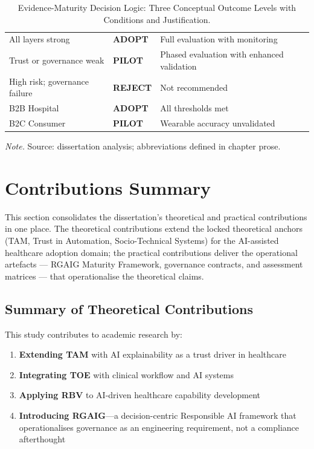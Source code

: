 {\tablestripes\tablefontsize
{}
\begin{xltabular}{\textwidth}{@{} >{\raggedright\arraybackslash}p{3.5cm} >{\centering\arraybackslash}p{2.0cm} L @{}}
\caption[Evidence-Maturity Decision Logic: Three Conceptual Outcome Levels with]{Evidence-Maturity Decision Logic: Three Conceptual Outcome Levels with Conditions and Justification.}\label{tab:ch5_decision_logic} \\
\toprule
{} &  &  \\
\midrule
\endfirsthead
\endhead
\bottomrule
\endlastfoot
All layers strong & \textbf{ADOPT} & Full evaluation with monitoring \\
\addlinespace
Trust or governance weak & \textbf{PILOT} & Phased evaluation with enhanced validation \\
\addlinespace
High risk; governance failure & \textbf{REJECT} & Not recommended \\
\midrule
B2B Hospital & \textbf{ADOPT} & All thresholds met \\
B2C Consumer & \textbf{PILOT} & Wearable accuracy unvalidated \\
\end{xltabular}}
\vspace{0.3em}\noindent\textit{Note.} Source: dissertation analysis; abbreviations defined in chapter prose.

\section{Contributions Summary}
\label{sec:ch5_contributions_summary}

\noindent This section consolidates the dissertation's theoretical and practical contributions in one place. The theoretical contributions extend the locked theoretical anchors (TAM, Trust in Automation, Socio-Technical Systems) for the AI-assisted healthcare adoption domain; the practical contributions deliver the operational artefacts — RGAIG Maturity Framework, governance contracts, and assessment matrices — that operationalise the theoretical claims.

\subsection{Summary of Theoretical Contributions}

This study contributes to academic research by:

\begin{enumerate}[label=(\alph*)]
    \item \textbf{Extending TAM} with AI explainability as a trust driver in healthcare
    \item \textbf{Integrating TOE} with clinical workflow and AI systems
    \item \textbf{Applying RBV} to AI-driven healthcare capability development
    \item \textbf{Introducing RGAIG}---a decision-centric Responsible AI framework that operationalises governance as an engineering requirement, not a compliance afterthought
\end{enumerate}


